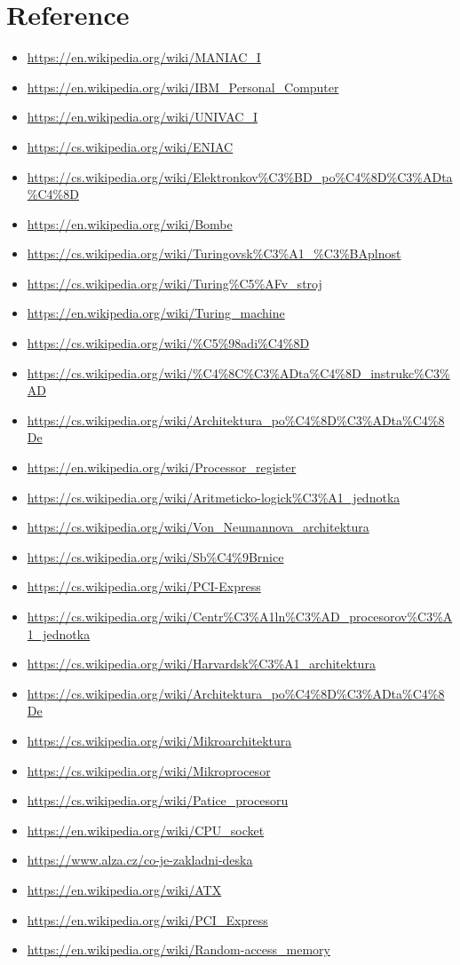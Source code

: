 \documentclass[a4paper]{article}
\begin{document}
\section{Reference}
    \begin{itemize}
        \item \url{https://en.wikipedia.org/wiki/MANIAC_I}
        \item \url{https://en.wikipedia.org/wiki/IBM_Personal_Computer}
        \item \url{https://en.wikipedia.org/wiki/UNIVAC_I}
        \item \url{https://cs.wikipedia.org/wiki/ENIAC}
        \item \url{https://cs.wikipedia.org/wiki/Elektronkov%C3%BD_po%C4%8D%C3%ADta%C4%8D}
        \item \url{https://en.wikipedia.org/wiki/Bombe}
        \item \url{https://cs.wikipedia.org/wiki/Turingovsk%C3%A1_%C3%BAplnost}
        \item \url{https://cs.wikipedia.org/wiki/Turing%C5%AFv_stroj}
        \item \url{https://en.wikipedia.org/wiki/Turing_machine}
        \item \url{https://cs.wikipedia.org/wiki/%C5%98adi%C4%8D}
        \item \url{https://cs.wikipedia.org/wiki/%C4%8C%C3%ADta%C4%8D_instrukc%C3%AD}
        \item \url{https://cs.wikipedia.org/wiki/Architektura_po%C4%8D%C3%ADta%C4%8De}
        \item \url{https://en.wikipedia.org/wiki/Processor_register}
        \item \url{https://cs.wikipedia.org/wiki/Aritmeticko-logick%C3%A1_jednotka}
        \item \url{https://cs.wikipedia.org/wiki/Von_Neumannova_architektura}
        \item \url{https://cs.wikipedia.org/wiki/Sb%C4%9Brnice}
        \item \url{https://cs.wikipedia.org/wiki/PCI-Express}
        \item \url{https://cs.wikipedia.org/wiki/Centr%C3%A1ln%C3%AD_procesorov%C3%A1_jednotka}
        \item \url{https://cs.wikipedia.org/wiki/Harvardsk%C3%A1_architektura}
        \item \url{https://cs.wikipedia.org/wiki/Architektura_po%C4%8D%C3%ADta%C4%8De}
        \item \url{https://cs.wikipedia.org/wiki/Mikroarchitektura}
        \item \url{https://cs.wikipedia.org/wiki/Mikroprocesor}
        \item \url{https://cs.wikipedia.org/wiki/Patice_procesoru}
        \item \url{https://en.wikipedia.org/wiki/CPU_socket}
        \item \url{https://www.alza.cz/co-je-zakladni-deska}
        \item \url{https://en.wikipedia.org/wiki/ATX}
        \item \url{https://en.wikipedia.org/wiki/PCI_Express}
        \item \url{https://en.wikipedia.org/wiki/Random-access_memory}
    \end{itemize}
\end{document}
